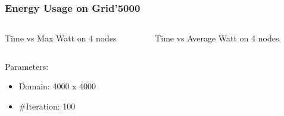 \documentclass{beamer}
\begin{document}
  \begin{frame}
\frametitle{Energy Usage on Grid'5000}
\begin{columns}
\begin{column}{6cm}
    \begin{center}
{\vspace{-1em}\small Time vs Max Watt on 4 nodes}
  \end{center}
\end{column}
\begin{column}{6cm}
\begin{center}
{\vspace{-1em}\small Time vs Average Watt on 4 nodes}
\end{center}
\end{column}
\end{columns}
\bigskip
{\small
\begin{block}{Parameters:}
\begin{itemize}
\vspace{-0.7em}\item Domain: 4000 x 4000
\item \#Iteration: 100
\end{itemize}
\end{block}
}
  \end{frame}
\end{document}
